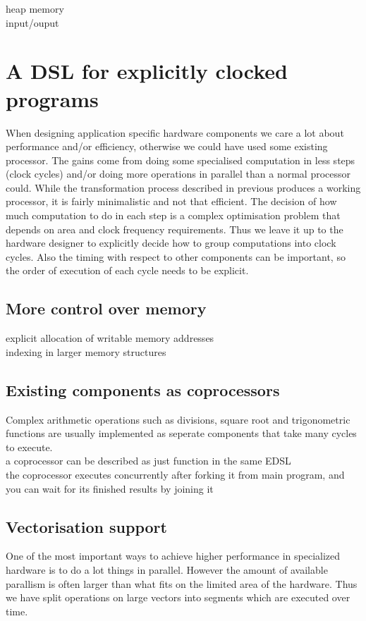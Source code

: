 \documentclass[preprint]{sigplanconf}
\begin{document}
heap memory \\
input/ouput 

\section{A DSL for explicitly clocked programs}
When designing application specific hardware components we care a lot about performance and/or efficiency, otherwise we could have used some existing processor.
The gains come from doing some specialised computation in less steps (clock cycles) and/or doing more operations in parallel than a normal processor could.
While the transformation process described in previous produces a working processor, it is fairly minimalistic and not that efficient.
The decision of how much computation to do in each step is a complex optimisation problem that depends on area and clock frequency requirements.
Thus we leave it up to the hardware designer to explicitly decide how to group computations into clock cycles.
Also the timing with respect to other components can be important, so the order of execution of each cycle needs to be explicit.

\subsection{More control over memory}
explicit allocation of writable memory addresses\\
indexing in larger memory structures

\subsection{Existing components as coprocessors}
Complex arithmetic operations such as divisions, square root and trigonometric functions are usually implemented as seperate components that take many cycles to execute. \\
a coprocessor can be described as just function in the same EDSL \\
the coprocessor executes concurrently after forking it from main program, and you can wait for its finished results by joining it

\subsection{Vectorisation support}
One of the most important ways to achieve higher performance in specialized hardware is to do a lot things in parallel.
However the amount of available parallism is often larger than what fits on the limited area of the hardware.
Thus we have split operations on large vectors into segments which are executed over time. \\
\end{document}
